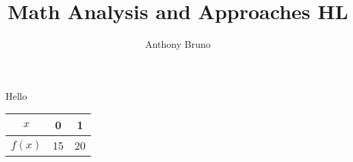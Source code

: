 \documentclass[12pt,letterpaper]{article}
\author{Anthony Bruno}
\title{Math Analysis and Approaches HL}
\begin{document}
\maketitle


Hello

\begin{tabular}{|c|c|c|}
\hline 
$x$ & 0 & 1 \\ 
\hline 
$f(x)$ & 15 & 20 \\ 
\hline 
\end{tabular} 
\end{document}
